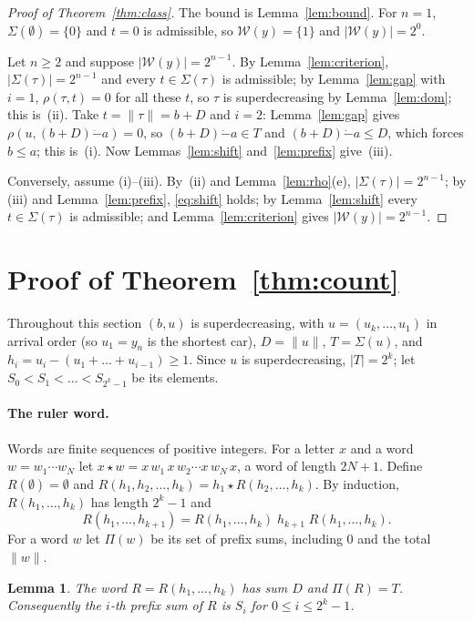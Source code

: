 \documentclass[11pt]{article}
\newtheorem{lemma}{Lemma}
\theoremstyle{remark}
\newcommand{\W}{\mathcal W}
\newcommand{\Sub}{\Sigma}
\newcommand{\monus}{\mathbin{\dot{-}}}
\begin{document}
\begin{proof}[Proof of Theorem~\ref{thm:class}]
The bound is Lemma~\ref{lem:bound}. For $n=1$, $\Sub(\emptyset)=\{0\}$ and
$t=0$ is admissible, so $\W(y)=\{1\}$ and $|\W(y)|=2^0$.

Let $n\ge2$ and suppose $|\W(y)|=2^{n-1}$. By Lemma~\ref{lem:criterion},
$|\Sub(\tau)|=2^{n-1}$ and every $t\in\Sub(\tau)$ is admissible; by
Lemma~\ref{lem:gap} with $i=1$, $\rho(\tau,t)=0$ for all these $t$, so $\tau$
is superdecreasing by Lemma~\ref{lem:dom}; this is~(ii). Take
$t=\|\tau\|=b+D$ and $i=2$: Lemma~\ref{lem:gap} gives $\rho(u,(b+D)\monus a)=0$,
so $(b+D)\monus a\in T$ and $(b+D)\monus a\le D$, which forces $b\le a$;
this is~(i). Now Lemmas~\ref{lem:shift} and~\ref{lem:prefix} give~(iii).

Conversely, assume (i)--(iii). By~(ii) and Lemma~\ref{lem:rho}(e),
$|\Sub(\tau)|=2^{n-1}$; by (iii) and Lemma~\ref{lem:prefix},
\eqref{eq:shift} holds; by Lemma~\ref{lem:shift} every $t\in\Sub(\tau)$ is
admissible; and Lemma~\ref{lem:criterion} gives $|\W(y)|=2^{n-1}$.
\end{proof}

\section{Proof of Theorem~\ref{thm:count}}\label{sec:count}

Throughout this section $(b,u)$ is superdecreasing, with $u=(u_k,\dots,u_1)$
in arrival order (so $u_1=y_n$ is the shortest car), $D=\|u\|$, $T=\Sub(u)$,
and $h_i=u_i-(u_1+\dots+u_{i-1})\ge1$. Since $u$ is superdecreasing,
$|T|=2^k$; let $S_0<S_1<\dots<S_{2^k-1}$ be its elements.

\paragraph{The ruler word.} Words are finite sequences of positive integers.
For a letter $x$ and a word $w=w_1\cdots w_N$ let
$x\star w=x\,w_1\,x\,w_2\cdots x\,w_N\,x$, a word of length $2N+1$. Define
$R(\emptyset)=\emptyset$ and $R(h_1,h_2,\dots,h_k)=h_1\star R(h_2,\dots,h_k)$.
By induction, $R(h_1,\dots,h_k)$ has length $2^k-1$ and
\begin{equation}\label{eq:ruler}
R(h_1,\dots,h_{k+1})=R(h_1,\dots,h_k)\;h_{k+1}\;R(h_1,\dots,h_k).
\end{equation}
For a word $w$ let $\Pi(w)$ be its set of prefix sums, including $0$ and the
total $\|w\|$.

\begin{lemma}\label{lem:walk}
The word $R=R(h_1,\dots,h_k)$ has sum $D$ and $\Pi(R)=T$. Consequently the
$i$-th prefix sum of $R$ is $S_i$ for $0\le i\le 2^k-1$.
\end{lemma}
\end{document}
